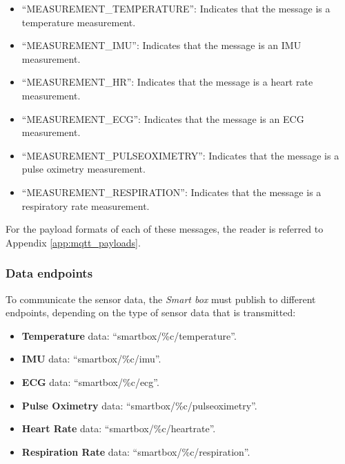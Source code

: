 \begin{itemize}
    \item ``MEASUREMENT\_TEMPERATURE'': Indicates that the message is a temperature measurement.
    \item ``MEASUREMENT\_IMU'': Indicates that the message is an \acs{IMU} measurement.
    \item ``MEASUREMENT\_HR'': Indicates that the message is a heart rate measurement.
    \item ``MEASUREMENT\_ECG'': Indicates that the message is an \acs{ECG} measurement.
    \item ``MEASUREMENT\_PULSEOXIMETRY'': Indicates that the message is a pulse oximetry measurement.
    \item ``MEASUREMENT\_RESPIRATION'': Indicates that the message is a respiratory rate measurement.
\end{itemize}

For the payload formats of each of these messages, the reader is referred to Appendix \ref{app:mqtt_payloads}.

\subsubsection{Data endpoints}
To communicate the sensor data, the \textit{Smart box} must publish to different endpoints, depending on the type of sensor data that is transmitted:

\begin{itemize}
    \item \textbf{Temperature} data: ``smartbox/\%c/temperature''.
    \item \textbf{\acf{IMU}} data: ``smartbox/\%c/imu''.
    \item \textbf{\acf{ECG}} data: ``smartbox/\%c/ecg''.
    \item \textbf{Pulse Oximetry} data: ``smartbox/\%c/pulseoximetry''.
    \item \textbf{Heart Rate} data: ``smartbox/\%c/heartrate''.
    \item \textbf{Respiration Rate} data: ``smartbox/\%c/respiration''.
\end{itemize}


